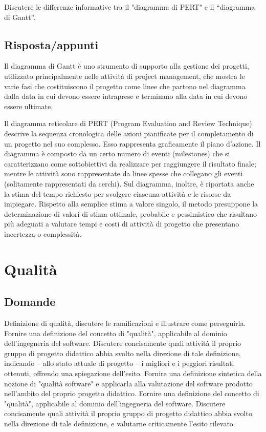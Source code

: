 Discutere le differenze informative tra il "diagramma di PERT" e il “diagramma di Gantt”.

\subsection*{Risposta/appunti}

Il diagramma di Gantt è uno strumento di supporto alla gestione dei progetti, utilizzato principalmente nelle attività di project management, che mostra le varie fasi che costituiscono il progetto come linee che partono nel diagramma dalla data in cui devono essere intraprese e terminano alla data in cui devono essere ultimate.

Il diagramma reticolare di PERT (Program Evaluation and Review Technique) descrive la sequenza cronologica delle azioni pianificate per il completamento di un progetto nel suo complesso. Esso rappresenta graficamente il piano d’azione. 
Il diagramma è composto da un certo numero di eventi (milestones) che si caratterizzano come sottobiettivi da realizzare per raggiungere il risultato finale; mentre le attività sono rappresentate da linee spesse che collegano gli eventi (solitamente rappresentati da cerchi). Sul diagramma, inoltre, è riportata anche la stima del tempo richiesto per svolgere ciascuna attività e le risorse da impiegare.
Rispetto alla semplice stima a valore singolo, il metodo presuppone la determinazione di valori di stima ottimale, probabile e pessimistico che risultano più adeguati a valutare tempi e costi di attività di progetto che presentano incertezza o complessità.


\section{Qualità}

\subsection*{Domande}
Definizione di qualità, discutere le ramificazioni e illustrare come perseguirla.
Fornire una definizione del concetto di "qualità", applicabile al dominio dell'ingegneria del software. Discutere concisamente quali attività il proprio gruppo di progetto didattico abbia svolto nella direzione di tale definizione, indicando – allo stato attuale di progetto – i migliori e i peggiori risultati ottenuti, offrendo una spiegazione dell'esito.
Fornire una definizione sintetica della nozione di "qualità software" e applicarla alla valutazione del software prodotto nell'ambito del proprio progetto didattico.
Fornire una definizione del concetto di "qualità", applicabile al dominio dell'ingegneria del software. Discutere concisamente quali attività il proprio gruppo di progetto didattico abbia svolto nella direzione di tale definizione, e valutarne criticamente l'esito rilevato.

